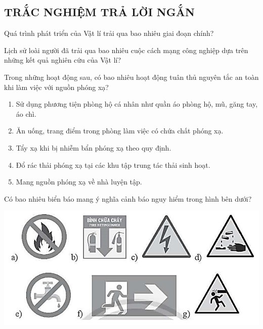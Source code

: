 \subsection{TRẮC NGHIỆM TRẢ LỜI NGẮN}
\setcounter{ex}{0}

\begin{ex} 
	Quá trình phát triển của Vật lí trải qua bao nhiêu giai đoạn chính?
\end{ex}
\begin{ex} 
	Lịch sử loài người đã trải qua bao nhiêu cuộc cách mạng công nghiệp dựa trên những kết quả nghiên cứu của Vật lí?
	\loigiai{}
\end{ex}
\begin{ex} 
	Trong những hoạt động sau, có bao nhiêu hoạt động tuân thủ nguyên tắc an toàn khi làm việc với nguồn phóng xạ?
	\begin{enumerate}[label=\arabic*.]
		\item Sử dụng phương tiện phòng hộ cá nhân như quần áo phòng hộ, mũ, găng tay, áo chì.
		\item Ăn uống, trang điểm trong phòng làm việc có chứa chất phóng xạ.
		\item Tẩy xạ khi bị nhiễm bẩn phóng xạ theo quy định.
		\item Đổ rác thải phóng xạ tại các khu tập trung tác thải sinh hoạt.
		\item Mang nguồn phóng xạ về nhà luyện tập.
	\end{enumerate}
\end{ex}
\begin{ex} 
	Có bao nhiêu biển báo mang ý nghĩa cảnh báo nguy hiểm trong hình bên dưới?
	\begin{center}
		\includegraphics[scale=0.5]{figs/G10Y25B1-8}
	\end{center}
\end{ex}
